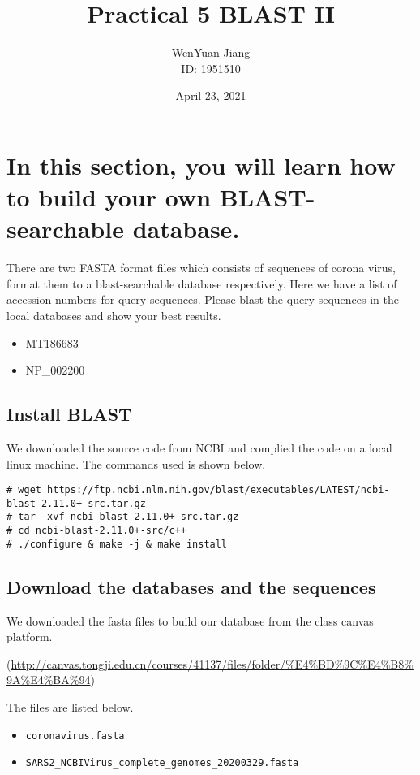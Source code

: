 \documentclass[en,black,10pt,normal]{elegantnote}
\title{Practical 5 BLAST II}
\author{WenYuan Jiang\\ID: 1951510}
\institute{School of Life Science, Tongji University}
\date{April 23, 2021}
\begin{document}
\maketitle

\section{In this section, you will learn how to build your own BLAST-searchable database.}

There are two FASTA format files which consists of sequences of corona virus, 
format them to a blast-searchable database respectively. 
Here we have a list  
of accession numbers for query sequences. Please blast the query sequences in the local databases and show your best results.

\begin{itemize}
    \item MT186683
    \item NP\_002200
\end{itemize}

\subsection{Install BLAST}

We downloaded the source code from NCBI and complied
the code on a local linux machine. The commands used is shown below.

\begin{lstlisting}
# wget https://ftp.ncbi.nlm.nih.gov/blast/executables/LATEST/ncbi-blast-2.11.0+-src.tar.gz
# tar -xvf ncbi-blast-2.11.0+-src.tar.gz
# cd ncbi-blast-2.11.0+-src/c++
# ./configure & make -j & make install
\end{lstlisting}



\subsection{Download the databases and the sequences}
We downloaded the fasta files to build our database from the class canvas platform.

(\url{http://canvas.tongji.edu.cn/courses/41137/files/folder/%E4%BD%9C%E4%B8%9A%E4%BA%94})


The files are listed below.
\begin{itemize}
    \item \lstinline{coronavirus.fasta}
    \item \lstinline{SARS2_NCBIVirus_complete_genomes_20200329.fasta}
\end{itemize}
\end{document}
